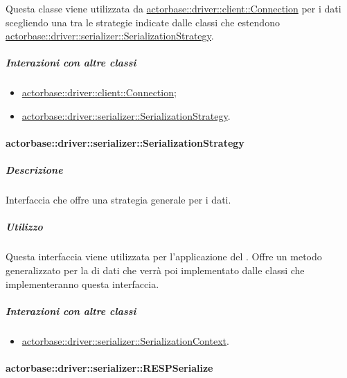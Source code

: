 \documentclass{scalatekids-article}
\begin{document}
Questa classe viene utilizzata da \hyperref[sec:actorbase::driver::client::Connection]{actorbase::driver::client::Connection}
per  i dati scegliendo una tra le strategie indicate
dalle classi che estendono \hyperref[sec:actorbase::driver::serializer::SerializationStrategy]{actorbase::driver::serializer::SerializationStrategy}.

\subparagraph{Interazioni con altre classi}

\begin{itemize}

\item \hyperref[sec:actorbase::driver::client::Connection]{actorbase::driver::client::Connection};
\item \hyperref[sec:actorbase::driver::serializer::SerializationStrategy]{actorbase::driver::serializer::SerializationStrategy}.

\end{itemize}

\paragraph{actorbase::driver::serializer::SerializationStrategy}
\label{sec:actorbase::driver::serializer::SerializationStrategy}

\subparagraph{Descrizione}

Interfaccia che offre una strategia generale per  i dati.

\subparagraph{Utilizzo}

Questa interfaccia viene utilizzata per l'applicazione del 
. Offre un metodo generalizzato per la
 di dati che verrà poi implementato dalle classi che
implementeranno questa interfaccia.

\subparagraph{Interazioni con altre classi}

\begin{itemize}

\item \hyperref[sec:actorbase::driver::serializer::SerializationContext]{actorbase::driver::serializer::SerializationContext}.

\end{itemize}

\paragraph{actorbase::driver::serializer::RESPSerialize}
\end{document}
